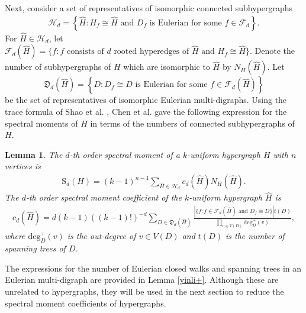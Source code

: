 \documentclass{article}
\newtheorem{lem}[thm]{Lemma}
\begin{document}
Next,
consider a set of representatives of isomorphic connected subhypergraphs
\begin{align*}
\mathcal{H}_{d}=\left\{ \widehat{H}: \mbox{$H_{f}\cong\widehat{H}$ and $D_f$ is Eulerian for some $f\in\mathcal{F}_{d}$} \right\}.
\end{align*}
For $\widehat{H}\in\mathcal{H}_{d}$,
let $\mathcal{F}_{d}(\widehat{H})=\{f:\mbox{$f$ consists of $d$ rooted hyperedges of $\widehat{H}$ and $H_{f}\cong\widehat{H}$}\}$.
Denote the number of subhypergraphs of $H$ which are isomorphic to $\widehat{H}$ by $N_{H}(\widehat{H})$.
Let \[\mathfrak{D}_{d}(\widehat{H})=\left\{D:\mbox{$D_{f}\cong D$ is  Eulerian for some $f\in\mathcal{F}_{d}(\widehat{H})$}\right\}\] be the set of representatives of isomorphic Eulerian multi-digraphs.
Using the trace formula of Shao et al. \cite{shao2015some},
Chen et al. \cite{chen2024spectra} gave the following expression for the spectral moments of $H$ in terms of the numbers of connected subhypergraphs of $H$.

\begin{lem}\citep[(2.3) and Lemma 2.3]{chen2024spectra}\label{yinli1}
The $d$-th order spectral moment of a $k$-uniform hypergraph $H$ with $n$ vertices is
\begin{align}\label{eq2}
\mathrm{S}_{d}(H)=(k-1)^{n-1}\sum_{\widehat{H}\in\mathcal{H}_{d}}c_{d}(\widehat{H})N_{H}(\widehat{H}).
\end{align}
The $d$-th order spectral moment coefficient of the $k$-uniform hypergraph $\widehat{H}$ is
\begin{align}\label{eq3}
c_{d}(\widehat{H})=d(k-1)((k-1)!)^{-d}\sum_{D\in\mathfrak{D}_{d}(\widehat{H})}\frac{\left|\{f:\mbox{$f\in\mathcal{F}_{d}(\widehat{H})$ and $D_{f}\cong D$}\}\right|t(D)}{\prod_{v\in V(D)}\mathrm{deg}_{D}^{+}(v)},
\end{align}
where $\mathrm{deg}_{D}^{+}(v)$ is the out-degree of $v \in V(D)$ and $t(D)$ is the number of spanning trees of $D$.
\end{lem}

The expressions for the number of Eulerian closed walks and spanning trees in an Eulerian multi-digraph are provided in Lemma \ref{yinli+}.
Although these are unrelated to hypergraphs,
they will be used in the next section to reduce the spectral moment coefficients of hypergraphs.
\end{document}
